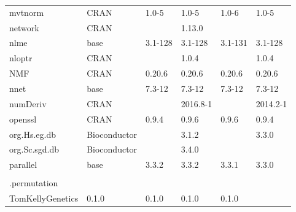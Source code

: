 \begin{longtable}{llllll}
\rowcolor{black!5}
mvtnorm                       & CRAN                      & 1.0-5       & 1.0-5       & 1.0-6          & 1.0-5              \\
\rowcolor{black!10}
network                       & CRAN                      &             & 1.13.0      &                &                   \\
\rowcolor{black!5}
nlme                          & base                      & 3.1-128     & 3.1-128     & 3.1-131        & 3.1-128            \\
\rowcolor{black!10}
nloptr                        & CRAN                      &             & 1.0.4       &                & 1.0.4             \\
\rowcolor{black!5}
NMF                           & CRAN                      & 0.20.6      & 0.20.6      & 0.20.6         & 0.20.6             \\
\rowcolor{black!10}
nnet                          & base                      & 7.3-12      & 7.3-12      & 7.3-12         & 7.3-12            \\
\rowcolor{black!5}
numDeriv                      & CRAN                      &             & 2016.8-1    &                & 2014.2-1           \\
\rowcolor{black!10}
openssl                       & CRAN                      & 0.9.4       & 0.9.6       & 0.9.6          & 0.9.4             \\
\rowcolor{black!5}
org.Hs.eg.db                  & Bioconductor              &             & 3.1.2       &                & 3.3.0              \\
\rowcolor{black!10}
org.Sc.sgd.db                 & Bioconductor              &             & 3.4.0       &                &                   \\
\rowcolor{black!5}
parallel                      & base                      & 3.3.2       & 3.3.2       & 3.3.1          & 3.3.0              \\
\rowcolor{black!10}
\begin{tabular}[c]{@{}l@{}}pathway.structure\\.permutation \end{tabular} & \begin{tabular}[c]{@{}l@{}}GitHub \\ TomKellyGenetics \end{tabular}  & 0.1.0       & 0.1.0       & 0.1.0          & 0.1.0             \\

\end{longtable}
